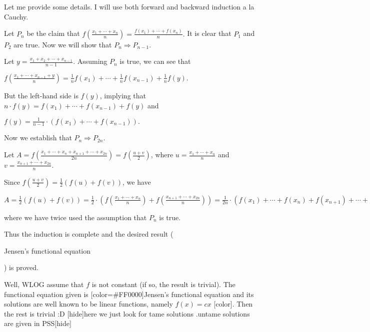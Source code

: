 \begin{solution}
	Let me provide some details.  I will use both forward and backward induction a la Cauchy.

Let $P_{n}$ be the claim that  $ f\left (\frac{x_{1}+\cdots+x_{n}}{n}\right )=\frac{f(x_{1})+\cdots+f(x_{n})}{n} .$  It is clear that $P_{1}$ and $P_{2}$ are true.  Now we will show that $P_{n}\Rightarrow P_{n-1}.$

Let $y=\frac{x_{1}+x_{2}+\cdots+x_{n-1}}{n-1}.$  Assuming $P_{n}$ is true, we can see that

$ f\left (\frac{x_{1}+\cdots+x_{n-1}+y}{n}\right )=\frac{1}{n}f(x_{1})+\cdots+\frac{1}{n}f(x_{n-1})+\frac{1}{n}f(y). $

But the left-hand side is $f(y)$, implying that $n\cdot f(y)= f(x_{1})+\cdots+f(x_{n-1})+f(y)$ and

$f(y)=\frac{1}{n-1}\cdot\left(f(x_{1})+\cdots+f(x_{n-1})\right).$

Now we establish that $P_{n}\Rightarrow P_{2n}.$

Let  $A=f \left(\frac {x_{1}+\cdots+x_{n}+x_{n+1}+\cdots+x_{2n}}{2n}\right)=f \left(\frac{u+v}{2}\right)$,
where $u=\frac{x_{1}+\cdots+x_{n}}{n}$ and $v=\frac{x_{n+1}+\cdots+x_{2n}}{n}.$

Since $f\left(\frac{u+v}{2}\right)= \frac{1}{2}\left(f(u)+f(v)\right)$, we have

$A= \frac{1}{2} \left(f(u)+f(v)\right)=\frac{1}{2}\cdot\left( f\left(\frac{x_{1}+\cdots+x_{n}}{n}\right)+f\left(\frac{x_{n+1}+\cdots+x_{2n}}{n}\right)\right)=\frac{1}{2n}\cdot\left(f(x_{1})+\cdots+f(x_{n})+f(x_{n+1})+\cdots+f(x_{2n})\right),$

where we have twice used the assumption that $P_{n}$ is true.

Thus the induction is complete and the desired result (\begin{italicized}Jensen's functional equation \end{italicized}) is proved.
\end{solution}



\begin{solution}
	Well, WLOG assume that $f$ is not constant (if so, the result is trivial). The functional equation given is [color=#FF0000]Jensen's functional equation and its solutions are well known to be linear functions, namely $f(x)=cx$ [\/color]. Then the rest is trivial :D
[hide]here we just look for tame solutions .untame solutions are  given in PSS[\/hide]
\end{solution}



